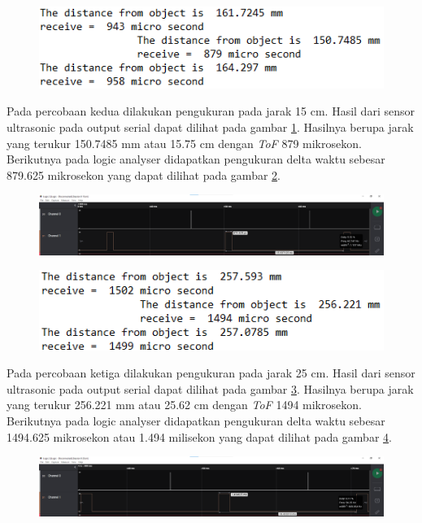 \begin{figure}[h!]
	\centering
	\includegraphics[width=0.7\linewidth]{gambar/serial15cm}
	\caption{}
	\label{fig:serial15cm}
\end{figure}

Pada percobaan kedua dilakukan pengukuran pada jarak 15 cm. Hasil dari sensor ultrasonic pada output 
serial dapat dilihat pada gambar \ref{fig:serial15cm}. Hasilnya berupa jarak yang terukur 150.7485 mm atau 15.75 cm dengan \textit{ToF} 879 mikrosekon. Berikutnya pada logic analyser didapatkan pengukuran 
delta waktu sebesar 879.625 mikrosekon yang dapat dilihat pada gambar \ref{fig:logic15cm}.

\begin{figure}[h!]
	\centering
	\includegraphics[width=\linewidth]{gambar/logic15cm}
	\caption{}
	\label{fig:logic15cm}
\end{figure}

\begin{figure}[h!]
	\centering
	\includegraphics[width=0.7\linewidth]{gambar/serial25cm}
	\caption{}
	\label{fig:serial25cm}
\end{figure}

Pada percobaan ketiga dilakukan pengukuran pada jarak 25 cm. Hasil dari sensor ultrasonic pada output 
serial dapat dilihat pada gambar \ref{fig:serial25cm}. Hasilnya berupa jarak yang terukur 256.221 mm atau 25.62 cm dengan \textit{ToF} 1494 mikrosekon. Berikutnya pada logic analyser didapatkan pengukuran 
delta waktu sebesar 1494.625 mikrosekon atau 1.494 milisekon yang dapat dilihat pada gambar \ref{fig:logic25cm}.

\begin{figure}[h!]
	\centering
	\includegraphics[width=\linewidth]{gambar/logic25cm}
	\caption{}
	\label{fig:logic25cm}
\end{figure}

